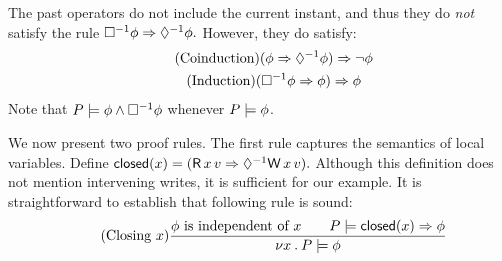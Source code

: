 \documentclass[conference]{IEEEtran}
\theoremstyle{plain}
\theoremstyle{definition}
\begin{document}
The past operators do not include the current instant, and thus 
they do \emph{not} satisfy the rule
\begin{math}
  \Box^{-1}\phi\Rightarrow\Diamond^{-1}\phi.
\end{math}
However, they do satisfy:
\begin{gather*}
  \tag{Coinduction}
  (\phi \Rightarrow\Diamond^{-1}{\phi}) \Rightarrow\lnot \phi
  \\
  \tag{Induction}
  (\Box^{-1}\phi \Rightarrow\phi) \Rightarrow\phi
\end{gather*}
Note that $P \models \phi \land \Box^{-1}\phi$ whenever $P \models \phi$.

We now present two proof rules.  The first rule captures the semantics of
local variables.  Define
\begin{math}
  \closed(\aLoc) = (\DR{\aLoc}{\aVal} \Rightarrow \once \DW{\aLoc}{\aVal}).
\end{math}
Although this definition does not mention intervening writes, it is
sufficient for our example.  It is straightforward to establish that
following rule is sound:
\begin{displaymath}
  \tag{Closing $\aLoc$}
  \frac{
    \afo \text{ is independent of } \aLoc
    \qquad
    \aPS \models \closed(\aLoc) \Rightarrow \afo
  }{
    \nu \aLoc \st \aPS \models \afo
  }
\end{displaymath}
\end{document}
